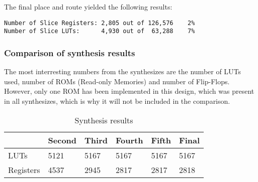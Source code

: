

The final place and route yielded the following results:
\begin{verbatim}
Number of Slice Registers: 2,805 out of 126,576    2%
Number of Slice LUTs:      4,930 out of  63,288    7%
\end{verbatim}

\subsubsection{Comparison of synthesis results}
The most interresting numbers from the synthesizes are the number of 
LUTs used, number of ROMs (Read-only Memories) and number of Flip-Flops. However, only one ROM has 
been implemented in this design, which was present in all synthesizes, 
which is why it will not be included in the comparison.

\begin{table}[h!]
  \centering
  \begin{tabular}{l | l | l | l | l | l}
    & Second & Third & Fourth & Fifth & Final \\ \hline
    LUTs       & 5121   & 5167  & 5167   & 5167  & 5167  \\ \hline
    Registers  & 4537   & 2945  & 2817   & 2817  & 2818  \\
  \end{tabular}
  \caption{Synthesis results}
  \label{table:synthesis}
\end{table}

